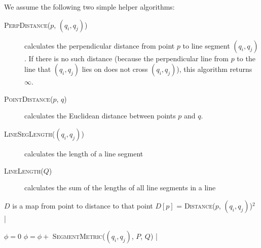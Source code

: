 We assume the following two simple helper algorithms:

\begin{description}
	\item[\textsc{PerpDistance}($p$, $(q_i, q_j)$)] calculates the perpendicular distance from point $p$ to line segment $(q_i, q_j)$.
		If there is no such distance (because the perpendicular line from $p$ to the line that $(q_i, q_j)$ lies on does not cross $(q_i, q_j)$), this algorithm returns $\infty$.
	\item[\textsc{PointDistance}($p$, $q$)] calculates the Euclidean distance between points $p$ and $q$.
	\item[\textsc{LineSegLength}($(q_i, q_j)$)] calculates the length of a line segment
	\item[\textsc{LineLength}($Q$)] calculates the sum of the lengths of all line segments in a line
\end{description}

\begin{sourcecode}
\qend

$D$ is a map from point to distance to that point
	$D[p]$ = \textsc{Distance}($p$, $(q_i, q_j)$)$^2$
|
\qend

$\phi = 0$
	$\phi = \phi + $ \textsc{SegmentMetric}($(q_i, q_j)$, $P$, $Q$)
|
\return{$\phi$}
\qend
\end{sourcecode}
